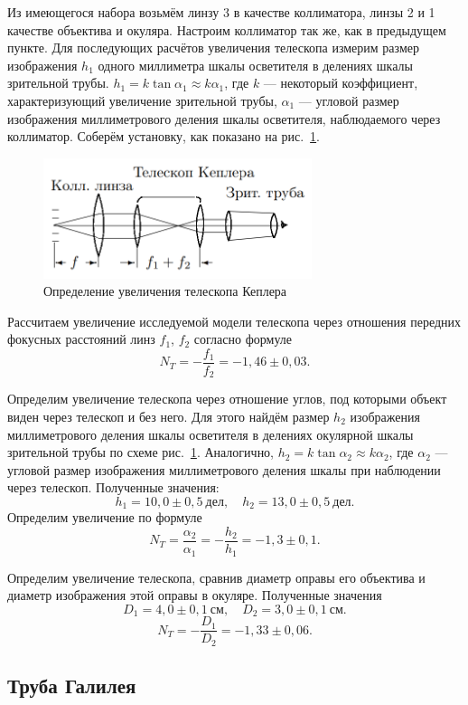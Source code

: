 \documentclass[a4paper, 12pt]{article}
\begin{document}
Из имеющегося набора возьмём линзу 3 в качестве коллиматора, линзы 2 и 1 качестве объектива и окуляра. Настроим коллиматор так же, как в предыдущем пункте. Для последующих расчётов увеличения телескопа измерим размер изображения $h_1$ одного миллиметра шкалы осветителя в делениях шкалы зрительной трубы. $h_1 = k \tan{\alpha_1} \approx k\alpha_1$, где $k$ --- некоторый коэффициент, характеризующий увеличение зрительной трубы, $\alpha_1$ --- угловой размер изображения миллиметрового деления шкалы осветителя, наблюдаемого через коллиматор. Соберём установку, как показано на рис.~\ref{fig:Kepler}.

\begin{figure}[h!]
\begin{center}
    \includegraphics[width=0.7\textwidth]{kepler.png}
\end{center}
\caption{Определение увеличения телескопа Кеплера}
\label{fig:Kepler}
\end{figure}

Рассчитаем увеличение исследуемой модели телескопа через отношения передних фокусных расстояний линз $f_1$, $f_2$ согласно формуле $$N_T = -\frac{f_1}{f_2} = -1,46\pm0,03.$$

Определим увеличение телескопа через отношение углов, под которыми объект виден через телескоп и без него. Для этого найдём размер $h_2$ изображения миллиметрового деления шкалы осветителя в делениях окулярной шкалы зрительной трубы по схеме рис.~\ref{fig:Kepler}. Аналогично, $h_2 = k\tan{\alpha_2} \approx k\alpha_2$, где $\alpha_2$ --- угловой размер изображения миллиметрового деления шкалы при наблюдении через телескоп. Полученные значения: $$h_1 = 10,0\pm0,5~дел, \quad h_2 = 13,0\pm0,5~дел.$$
Определим увеличение по формуле $$N_T = \frac{\alpha_2}{\alpha_1} = -\frac{h_2}{h_1} = -1,3\pm0,1.$$

Определим увеличение телескопа, сравнив диаметр оправы его объектива и диаметр изображения этой оправы в окуляре. Полученные значения $$D_1 = 4,0\pm0,1~см, \quad D_2 = 3,0\pm0,1~см.$$ $$N_T = -\frac{D_1}{D_2} = -1,33\pm0,06.$$

\subsection{Труба Галилея}
\end{document}
